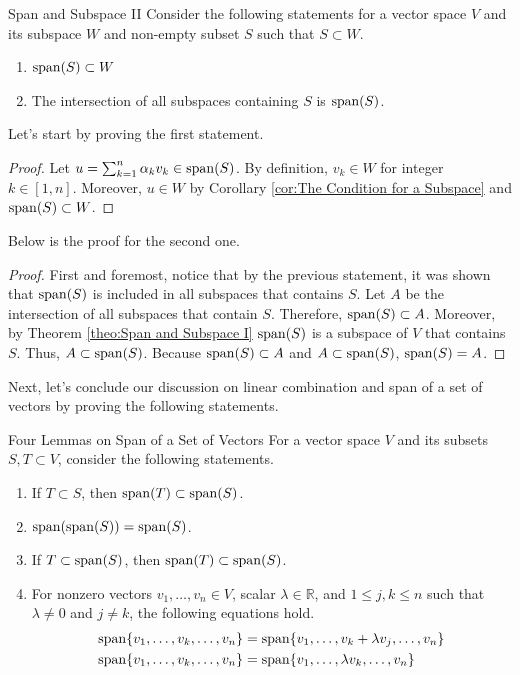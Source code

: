 \documentclass[../../main.tex]{subfiles}
\begin{document}
\begin{theorem}{}{Span and Subspace II}
Consider the following statements for a vector space $V$ and its
subspace $W$ and non-empty subset $S$ such that $S \subset W$.
\begin{enumerate}[noitemsep]
\item $\operatorname{span}(S) \subset W$
\item The intersection of all subspaces containing $S$ is $\operatorname{span}(S)$.
\end{enumerate}
\end{theorem}

Let's start by proving the first statement.

\begin{proof}
Let $u = \sum_{k = 1}^n \alpha_k v_k \in \operatorname{span}(S)$. By definition,
$v_k \in W$ for integer $k \in [1, n]$. Moreover, $u \in W$ by
Corollary \ref{cor:The Condition for a Subspace} and $\operatorname{span}(S)
\subset W$.
\end{proof}

Below is the proof for the second one.

\begin{proof}
First and foremost, notice that by the previous statement, it was
shown that $\operatorname{span}(S)$ is included in all subspaces that contains $S$.
Let $A$ be the intersection of all subspaces that contain $S$.
Therefore, $\operatorname{span}(S) \subset A$. Moreover, by Theorem
\ref{theo:Span and Subspace I} $\operatorname{span}(S)$ is a subspace of $V$ that
contains $S$. Thus, $A \subset \operatorname{span}(S)$. Because $\operatorname{span}(S) \subset A$
and $A \subset \operatorname{span}(S)$, $\operatorname{span}(S) = A$.
\end{proof}

Next, let's conclude our discussion on linear combination and span
of a set of vectors by proving the following statements.

\begin{theorem}{}{Four Lemmas on Span of a Set of Vectors}
For a vector space $V$ and its subsets $S, T \subset V$, consider the
following statements.
\begin{enumerate}[noitemsep]
\item If $T \subset S$, then $\operatorname{span}(T) \subset \operatorname{span}(S)$.
\item $\operatorname{span}(\operatorname{span}(S)) = \operatorname{span}(S)$.
\item If $T \subset \operatorname{span}(S)$, then $\operatorname{span}(T) \subset \operatorname{span}(S)$.
\item For nonzero vectors $v_1, \ldots, v_n \in V$, scalar
$\lambda \in \mathbb{R}$, and $1 \leq j, k \leq n$ such that $\lambda
\neq 0$ and $j \neq k$, the following equations hold.
\vspace{-0.5\baselineskip}
\begin{align*}
    \operatorname{span}\{ v_1, \ldots, v_k, \ldots, v_n \}
    &= \operatorname{span}\{ v_1, \ldots, v_k + \lambda v_j, \ldots, v_n \} \\
    \operatorname{span}\{ v_1, \ldots, v_k, \ldots, v_n \}
    &= \operatorname{span}\{ v_1, \ldots, \lambda v_k, \ldots, v_n \}
\end{align*}
\end{enumerate}
\end{theorem}
\end{document}

